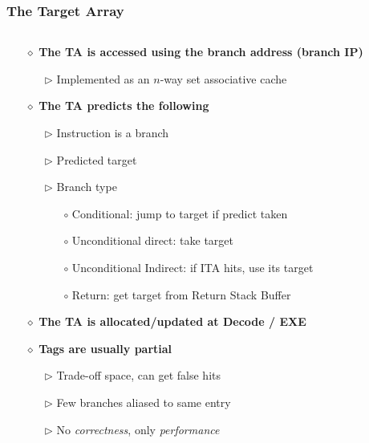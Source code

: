 \documentclass[aspectratio=169]{beamer}
\begin{document}
\begin{frame}
\frametitle{The Target Array}
\label{frame:target_array}

\begin{columns}[T]
\begin{column}{0.58\textwidth}
\begin{itemize}
    \item[$\diamond$] \textbf{The TA is accessed using the branch address (branch IP)}
    \begin{itemize}
        \item[$\triangleright$] Implemented as an $n$-way set associative cache
    \end{itemize}
\end{itemize}

\vspace{0.15cm}

\begin{itemize}
    \item[$\diamond$] \textbf{The TA predicts the following}
    \begin{itemize}
        \item[$\triangleright$] Instruction is a branch
        \item[$\triangleright$] Predicted target
        \item[$\triangleright$] Branch type
        \begin{itemize}
            \item[$\circ$] Conditional: jump to target if predict taken
            \item[$\circ$] Unconditional direct: take target
            \item[$\circ$] Unconditional Indirect: if ITA hits, use its target
            \item[$\circ$] Return: get target from Return Stack Buffer
        \end{itemize}
    \end{itemize}
\end{itemize}

\vspace{0.15cm}

\begin{itemize}
    \item[$\diamond$] \textbf{The TA is allocated/updated at Decode / EXE}
\end{itemize}

\vspace{0.15cm}

\begin{itemize}
    \item[$\diamond$] \textbf{Tags are usually partial}
    \begin{itemize}
        \item[$\triangleright$] Trade-off space, can get false hits
        \item[$\triangleright$] Few branches aliased to same entry
        \item[$\triangleright$] No \textit{correctness}, only \textit{performance}
    \end{itemize}
\end{itemize}
\end{column}


\end{columns}
\end{frame}
\end{document}
